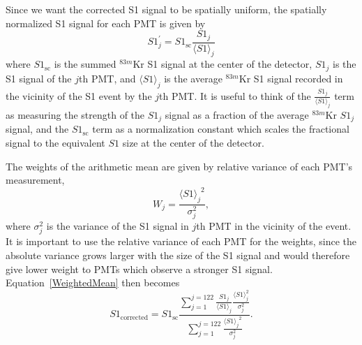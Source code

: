 Since we want the corrected S1 signal to be spatially uniform, the spatially normalized S1 signal for each PMT is given by
\begin{equation}
S1^{\prime}_{j} = S1_{\mbox{sc}} \frac{S1_j}{\langle S1 \rangle_{j}}
\end{equation}
where $S1_{\mbox{sc}}$ is the summed $^{83m}$Kr S1 signal at the center of the detector, $S1_j$ is the S1 signal of the $j$th PMT, and $\langle S1 \rangle_{j}$ is the average $^{83m}$Kr S1 signal recorded in the vicinity of the S1 event by the $j$th PMT.  It is useful to think of the $ \frac{S1_j}{\langle S1 \rangle_{j}}$ term as measuring the strength of the $S1_j$ signal as a fraction of the average $^{83m}$Kr $S1_j$ signal, and the $S1_{\mbox{sc}}$ term as a normalization constant which scales the fractional signal to the equivalent $S1$ size at the center of the detector.

The weights of the arithmetic mean are given by relative variance of each PMT's measurement,
\begin{equation}
W_j=\frac{{\langle S1 \rangle_{j}}^2}{\sigma_j^2},
\end{equation}
where $\sigma_j^2$ is the variance of the S1 signal in $j$th PMT in the vicinity of the event.  It is important to use the relative variance of each PMT for the weights, since the absolute variance grows larger with the size of the S1 signal and would therefore give lower weight to PMTs which observe a stronger S1 signal.  Equation~\ref{WeightedMean} then becomes
\begin{equation} \label{WeightedMean2}
S1_{\mbox{corrected}} = S1_{\mbox{sc}} \frac{\sum_{j=1}^{j=122} \frac{S1_j}{\langle S1 \rangle_{j}} \frac{{\langle S1 \rangle_{j}^2}}{\sigma_j^2}} {\sum_{j=1}^{j=122} \frac{{\langle S1 \rangle_{j}}^2}{\sigma_j^2}}.
\end{equation}

